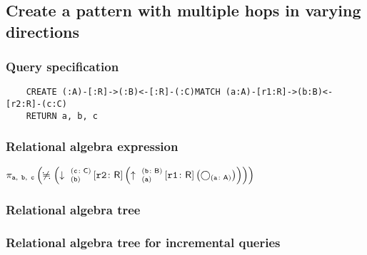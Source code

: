 	\subsection{Create a pattern with multiple hops in varying directions}

	\subsubsection*{Query specification}

	\begin{lstlisting}
	CREATE (:A)-[:R]->(:B)<-[:R]-(:C)MATCH (a:A)-[r1:R]->(b:B)<-[r2:R]-(c:C)
	RETURN a, b, c
	\end{lstlisting}


	\subsubsection*{Relational algebra expression}

	$\projection{\var{a},~\var{b},~\var{c}} \left(\alldifferent{} \left(\expandin{b}{c}{C}{r2}{R} \left(\expandout{a}{b}{B}{r1}{R} \left(\getvertices{a}{A}\right)\right)\right)\right)$

	\subsubsection*{Relational algebra tree}


	\subsubsection*{Relational algebra tree for incremental queries}

